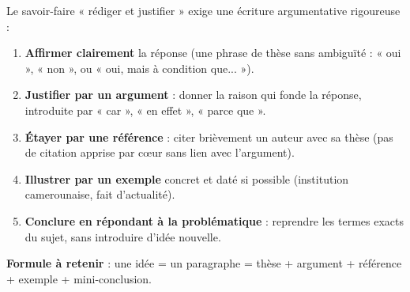 \documentclass[11pt]{article}
\begin{document}
\begin{methode}
Le savoir-faire « rédiger et justifier » exige une écriture argumentative rigoureuse :
\begin{enumerate}
\item \textbf{Affirmer clairement} la réponse (une phrase de thèse sans ambiguïté : « oui », « non », ou « oui, mais à condition que... »).
\item \textbf{Justifier par un argument} : donner la raison qui fonde la réponse, introduite par « car », « en effet », « parce que ».
\item \textbf{Étayer par une référence} : citer brièvement un auteur avec sa thèse (pas de citation apprise par cœur sans lien avec l'argument).
\item \textbf{Illustrer par un exemple} concret et daté si possible (institution camerounaise, fait d'actualité).
\item \textbf{Conclure en répondant à la problématique} : reprendre les termes exacts du sujet, sans introduire d'idée nouvelle.
\end{enumerate}
\textbf{Formule à retenir} : une idée = un paragraphe = thèse + argument + référence + exemple + mini-conclusion.
\end{methode}
\end{document}
